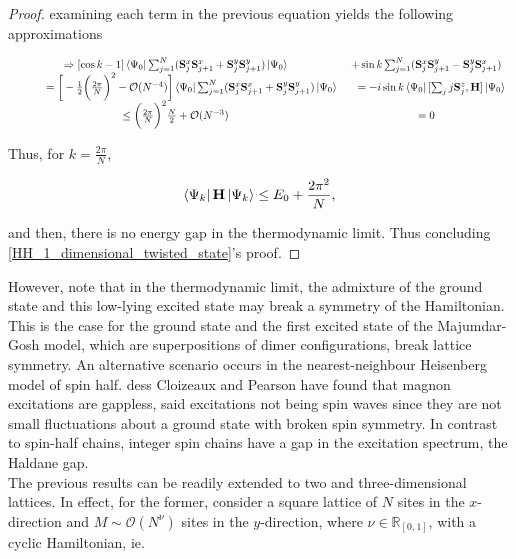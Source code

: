 \documentclass{homework}
\begin{document}
\begin{proof}
examining each term in the previous equation yields the following approximations

\begin{equation}
    \begin{array}{cc}
     \Rightarrow [\cos k - 1] \bra{\Psi_0} \sum_{j=1}^N ({\bf S}_j^x {\bf S}_{j+1}^x + {\bf S}_j^y {\bf S}_{j+1}^y) \ket{\Psi_0} &  + \sin k \sum_{j=1}^N ({\bf S}_j^x {\bf S}_{j+1}^y - {\bf S}_j^y {\bf S}_{j+1}^x) \\
     \textnormal{ } \textnormal{ } \textnormal{ } \textnormal{ } \textnormal{ } \textnormal{ } \textnormal{ } \textnormal{ } = \bigg[-\frac{1}{2} \bigg(\frac{2\pi}{N}\bigg)^2 - \mathcal{O}(N^{-4})\bigg] \bra{\Psi_0} \sum_{j=1}^N ({\bf S}_j^x {\bf S}_{j+1}^x + {\bf S}_j^y {\bf S}_{j+1}^y) \ket{\Psi_0} & \textnormal{ } \textnormal{ } = -i \sin k \bra{\Psi_0} [\sum_{j} j {\bf S}_j^z, {\bf H}]\ket{\Psi_0} \\
     \leq \bigg(\frac{2\pi}{N}\bigg)^2 \frac{N}{2} + \mathcal{O}(N^{-3}) & = 0
    \end{array}
\end{equation}

Thus, for $k = \frac{2\pi}{N}$, 

$$
    \bra{\Psi_k} {{\bf H}} \ket{\Psi_k} \leq E_0 + \frac{2\pi^2}{N},
$$

and then, there is no energy gap in the thermodynamic limit. Thus concluding \cref{HH_1_dimensional_twisted_state}'s proof.  
\end{proof}

However, note that in the thermodynamic limit, the admixture of the ground state and this low-lying excited state may break a symmetry of the Hamiltonian. This is the case for the ground state and the first excited state of the Majumdar-Gosh model, which are superpositions of dimer configurations, break lattice symmetry. An alternative scenario occurs in the nearest-neighbour Heisenberg model of spin half. dess Cloizeaux and Pearson have found that magnon excitations are gappless, said excitations not being spin waves since they are not small fluctuations about a ground state with broken spin symmetry. In contrast to spin-half chains, integer spin chains have a gap in the excitation spectrum, the Haldane gap. \\

The previous results can be readily extended to two and three-dimensional lattices. In effect, for the former, consider a square lattice of $N$ sites in the $x$-direction and $M \sim \mathcal{O}(N^\nu)$ sites in the $y$-direction, where $\nu \in \mathds{R}_{[0,1]}$, with a cyclic Hamiltonian, ie.
\end{document}
